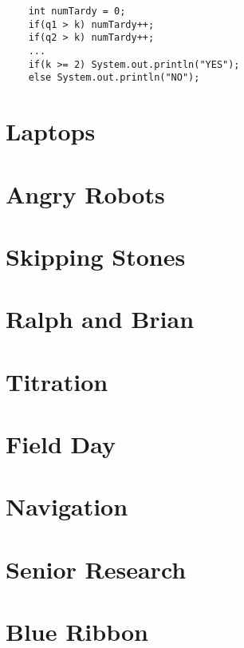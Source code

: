 \documentclass{article}
\begin{document}
\begin{lstlisting}
    int numTardy = 0;
    if(q1 > k) numTardy++;
    if(q2 > k) numTardy++;
    ...
    if(k >= 2) System.out.println("YES");
    else System.out.println("NO");
\end{lstlisting}

\section{Laptops}
\section{Angry Robots}
\section{Skipping Stones}
\section{Ralph and Brian}
\section{Titration}
\section{Field Day}
\section{Navigation}
\section{Senior Research}
\section{Blue Ribbon}
\end{document}
